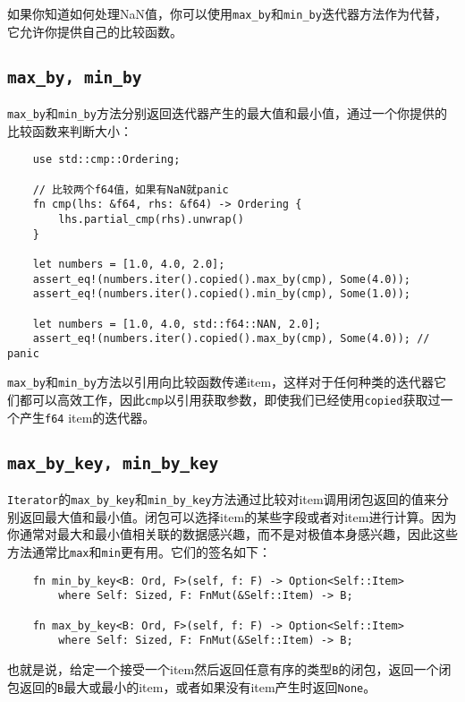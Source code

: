 如果你知道如何处理NaN值，你可以使用\texttt{max\_by}和\texttt{min\_by}迭代器方法作为代替，它允许你提供自己的比较函数。

\subsection{\texttt{max\_by, min\_by}}
\texttt{max\_by}和\texttt{min\_by}方法分别返回迭代器产生的最大值和最小值，通过一个你提供的比较函数来判断大小：
\begin{verbatim}
    use std::cmp::Ordering;

    // 比较两个f64值，如果有NaN就panic
    fn cmp(lhs: &f64, rhs: &f64) -> Ordering {
        lhs.partial_cmp(rhs).unwrap()
    }
    
    let numbers = [1.0, 4.0, 2.0];
    assert_eq!(numbers.iter().copied().max_by(cmp), Some(4.0));
    assert_eq!(numbers.iter().copied().min_by(cmp), Some(1.0));

    let numbers = [1.0, 4.0, std::f64::NAN, 2.0];
    assert_eq!(numbers.iter().copied().max_by(cmp), Some(4.0)); // panic
\end{verbatim}

\texttt{max\_by}和\texttt{min\_by}方法以引用向比较函数传递item，这样对于任何种类的迭代器它们都可以高效工作，因此\texttt{cmp}以引用获取参数，即使我们已经使用\texttt{copied}获取过一个产生\texttt{f64} item的迭代器。

\subsection{\texttt{max\_by\_key, min\_by\_key}}
\texttt{Iterator}的\texttt{max\_by\_key}和\texttt{min\_by_key}方法通过比较对item调用闭包返回的值来分别返回最大值和最小值。闭包可以选择item的某些字段或者对item进行计算。因为你通常对最大和最小值相关联的数据感兴趣，而不是对极值本身感兴趣，因此这些方法通常比\texttt{max}和\texttt{min}更有用。它们的签名如下：
\begin{verbatim}
    fn min_by_key<B: Ord, F>(self, f: F) -> Option<Self::Item>
        where Self: Sized, F: FnMut(&Self::Item) -> B;

    fn max_by_key<B: Ord, F>(self, f: F) -> Option<Self::Item>
        where Self: Sized, F: FnMut(&Self::Item) -> B;
\end{verbatim}

也就是说，给定一个接受一个item然后返回任意有序的类型\texttt{B}的闭包，返回一个闭包返回的\texttt{B}最大或最小的item，或者如果没有item产生时返回\texttt{None}。

